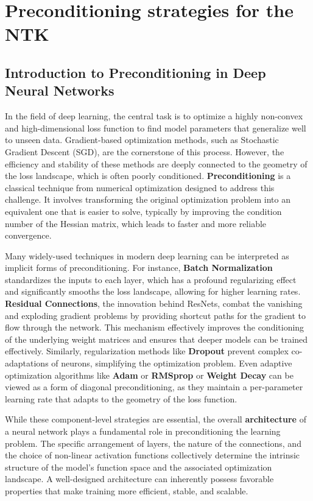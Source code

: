 \documentclass[a4paper]{article}
\theoremstyle{plain}
\theoremstyle{definition}
\theoremstyle{remark}
\begin{document}
\newpage





\section{Preconditioning strategies for the NTK}

\subsection{Introduction to Preconditioning in Deep Neural Networks}

In the field of deep learning, the central task is to optimize a highly non-convex and high-dimensional loss function to find model parameters that generalize well to unseen data. Gradient-based optimization methods, such as Stochastic Gradient Descent (SGD), are the cornerstone of this process. However, the efficiency and stability of these methods are deeply connected to the geometry of the loss landscape, which is often poorly conditioned. \textbf{Preconditioning} is a classical technique from numerical optimization designed to address this challenge. It involves transforming the original optimization problem into an equivalent one that is easier to solve, typically by improving the condition number of the Hessian matrix, which leads to faster and more reliable convergence.

Many widely-used techniques in modern deep learning can be interpreted as implicit forms of preconditioning. For instance, \textbf{Batch Normalization} standardizes the inputs to each layer, which has a profound regularizing effect and significantly smooths the loss landscape, allowing for higher learning rates. \textbf{Residual Connections}, the innovation behind ResNets, combat the vanishing and exploding gradient problems by providing shortcut paths for the gradient to flow through the network. This mechanism effectively improves the conditioning of the underlying weight matrices and ensures that deeper models can be trained effectively. Similarly, regularization methods like \textbf{Dropout} prevent complex co-adaptations of neurons, simplifying the optimization problem. Even adaptive optimization algorithms like \textbf{Adam} or \textbf{RMSprop} or \textbf{Weight Decay} can be viewed as a form of diagonal preconditioning, as they maintain a per-parameter learning rate that adapts to the geometry of the loss function.

While these component-level strategies are essential, the overall \textbf{architecture} of a neural network plays a fundamental role in preconditioning the learning problem. The specific arrangement of layers, the nature of the connections, and the choice of non-linear activation functions collectively determine the intrinsic structure of the model's function space and the associated optimization landscape. A well-designed architecture can inherently possess favorable properties that make training more efficient, stable, and scalable.
\end{document}
